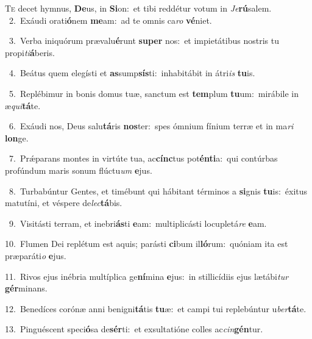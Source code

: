 \lettrine{\initial\textcolor{\initialcolor}{T}}{e} decet hymnus, \textbf{De}\-us, in \textbf{Si}\-on:~\star et tibi reddétur votum in \textit{Je}\-\textbf{rú}salem.\\
{\numbfont\textcolor{\numbcolor}{~2.}}~Exáudi orati\-\textbf{ó}\-nem \textbf{me}\-am:~\star ad te omnis ca\textit{ro} \textbf{vé}\-niet.\par
{\numbfont\textcolor{\numbcolor}{~3.}}~Verba iniquórum prævalu\-\textbf{é}\-runt \textbf{su}\-\textbf{per} nos:~\star et impietátibus nostris tu propi\-\textit{ti}\-\textbf{á}beris.\par
{\numbfont\textcolor{\numbcolor}{~4.}}~Beátus quem elegísti et \textbf{as}\-sump\-\textbf{sís}\-ti:~\star inhabitábit in átri\textit{is} \textbf{tu}\-is.\par
{\numbfont\textcolor{\numbcolor}{~5.}}~Replébimur in bonis domus tuæ, sanctum est \textbf{tem}\-plum \textbf{tu}\-um:~\star mirábile in æ\-\textit{qui}\-\textbf{tá}te.\par
{\numbfont\textcolor{\numbcolor}{~6.}}~Exáudi nos, Deus salu\-\textbf{tá}\-ris \textbf{nos}\-ter:~\star spes ómnium fínium terræ et in ma\textit{ri} \textbf{lon}\-ge.\par
{\numbfont\textcolor{\numbcolor}{~7.}}~Prǽparans montes in virtúte tua, ac\-\textbf{cínc}\-tus pot\-\textbf{én}\-\textbf{ti}a:~\star qui contúrbas profúndum maris sonum flúctu\textit{um} \textbf{e}\-jus.\par
{\numbfont\textcolor{\numbcolor}{~8.}}~Turbabúntur Gentes, et timébunt qui hábitant términos a \textbf{si}\-gnis \textbf{tu}\-is:~\star éxitus matutíni, et véspere de\-\textit{lec}\-\textbf{tá}bis.\par
{\numbfont\textcolor{\numbcolor}{~9.}}~Visitásti terram, et inebri\-\textbf{ás}\-ti \textbf{e}\-am:~\star multiplicásti locupletá\textit{re} \textbf{e}\-am.\par
{\numbfont\textcolor{\numbcolor}{10.}}~Flumen Dei replétum est aquis; parásti \textbf{ci}\-bum il\-\textbf{ló}\-rum:~\star quóniam ita est præparáti\textit{o} \textbf{e}\-jus.\par
{\numbfont\textcolor{\numbcolor}{11.}}~Rivos ejus inébria multíplica ge\-\textbf{ní}\-mina \textbf{e}\-jus:~\star in stillicídiis ejus lætábi\textit{tur} \textbf{gér}\-minans.\par
{\numbfont\textcolor{\numbcolor}{12.}}~Benedíces corónæ anni benigni\-\textbf{tá}\-tis \textbf{tu}\-æ:~\star et campi tui replebúntur u\-\textit{ber}\-\textbf{tá}te.\par
{\numbfont\textcolor{\numbcolor}{13.}}~Pinguéscent speci\-\textbf{ó}\-sa de\-\textbf{sér}\-ti:~\star et exsultatióne colles ac\-\textit{cin}\-\textbf{gén}tur.\par
